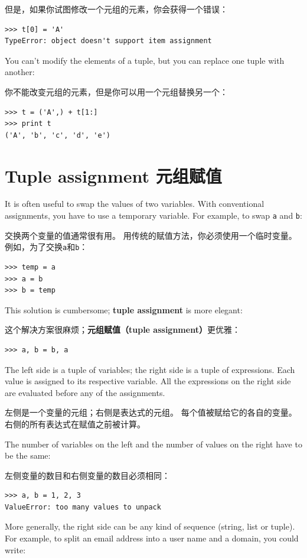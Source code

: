 \documentclass[10pt]{book}
\begin{document}
\begin{CJK}{UTF8}{gbsn}
但是，如果你试图修改一个元组的元素，你会获得一个错误：

\begin{verbatim}
>>> t[0] = 'A'
TypeError: object doesn't support item assignment
\end{verbatim}
%
You can't modify the elements of a tuple, but you can replace
one tuple with another:

你不能改变元组的元素，但是你可以用一个元组替换另一个：

\begin{verbatim}
>>> t = ('A',) + t[1:]
>>> print t
('A', 'b', 'c', 'd', 'e')
\end{verbatim}
%

\section{Tuple assignment 元组赋值}
\label{tuple.assignment}

It is often useful to swap the values of two variables.
With conventional assignments, you have to use a temporary
variable.  For example, to swap {\tt a} and {\tt b}:

交换两个变量的值通常很有用。
用传统的赋值方法，你必须使用一个临时变量。
例如，为了交换{\tt a}和{\tt b}：

\begin{verbatim}
>>> temp = a
>>> a = b
>>> b = temp
\end{verbatim}
%
This solution is cumbersome; {\bf tuple assignment} is more elegant:

这个解决方案很麻烦；{\bf 元组赋值（tuple assignment）}更优雅：

\begin{verbatim}
>>> a, b = b, a
\end{verbatim}
%
The left side is a tuple of variables; the right side is a tuple of
expressions.  Each value is assigned to its respective variable.  
All the expressions on the right side are evaluated before any
of the assignments.

左侧是一个变量的元组；右侧是表达式的元组。
每个值被赋给它的各自的变量。
右侧的所有表达式在赋值之前被计算。

The number of variables on the left and the number of
values on the right have to be the same:

左侧变量的数目和右侧变量的数目必须相同：

\begin{verbatim}
>>> a, b = 1, 2, 3
ValueError: too many values to unpack
\end{verbatim}
%
More generally, the right side can be any kind of sequence
(string, list or tuple).  For example, to split an email address
into a user name and a domain, you could write:


\end{CJK}
\end{document}
